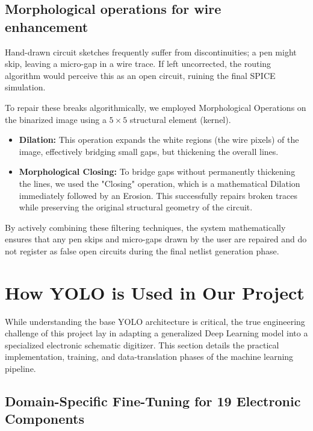 \documentclass[12pt]{article}
\begin{document}
\subsection{Morphological operations for wire enhancement}

Hand-drawn circuit sketches frequently suffer from discontinuities; a pen might skip, leaving a micro-gap in a wire trace. If left uncorrected, the routing algorithm would perceive this as an open circuit, ruining the final SPICE simulation.

To repair these breaks algorithmically, we employed Morphological Operations on the binarized image using a $5 \times 5$ structural element (kernel).
\begin{itemize}
    \item \textbf{Dilation:} This operation expands the white regions (the wire pixels) of the image, effectively bridging small gaps, but thickening the overall lines.
    \item \textbf{Morphological Closing:} To bridge gaps without permanently thickening the lines, we used the "Closing" operation, which is a mathematical Dilation immediately followed by an Erosion. This successfully repairs broken traces while preserving the original structural geometry of the circuit.
\end{itemize}

By actively combining these filtering techniques, the system mathematically ensures that any pen skips and micro-gaps drawn by the user are repaired and do not register as false open circuits during the final netlist generation phase.

\section{How YOLO is Used in Our Project}

While understanding the base YOLO architecture is critical, the true engineering challenge of this project lay in adapting a generalized Deep Learning model into a specialized electronic schematic digitizer. This section details the practical implementation, training, and data-translation phases of the machine learning pipeline.

\subsection{Domain-Specific Fine-Tuning for 19 Electronic Components}
\end{document}

